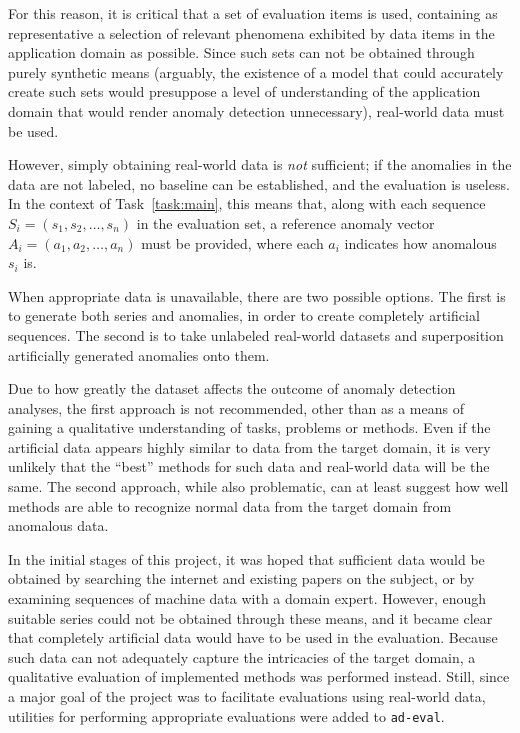 For this reason, it is critical that a set of evaluation items is used, containing as representative a selection of relevant phenomena exhibited by data items in the application domain as possible. Since such sets can not be obtained through purely synthetic means (arguably, the existence of a model that could accurately create such sets would presuppose a level of understanding of the application domain that would render anomaly detection unnecessary), real-world data must be used.

However, simply obtaining real-world data is \emph{not} sufficient; if the anomalies in the data are not labeled, no baseline can be established, and the evaluation is useless. In the context of Task~\ref{task:main}, this means that, along with each sequence $S_i = (s_1, s_2, \dots, s_n)$ in the evaluation set, a reference anomaly vector $A_i = (a_1, a_2, \dots, a_n)$ must be provided, where each $a_i$ indicates how anomalous $s_i$ is.

When appropriate data is unavailable, there are two possible options. The first is to generate both series and anomalies, in order to create completely artificial sequences. The second is to take unlabeled real-world datasets and superposition artificially generated anomalies onto them.

Due to how greatly the dataset affects the outcome of anomaly detection analyses, the first approach is not recommended, other than as a means of gaining a qualitative understanding of tasks, problems or methods. Even if the artificial data appears highly similar to data from the target domain, it is very unlikely that the ``best'' methods for such data and real-world data will be the same. The second approach, while also problematic, can at least suggest how well methods are able to recognize normal data from the target domain from anomalous data.

In the initial stages of this project, it was hoped that sufficient data would be obtained by searching the internet and existing papers on the subject, or by examining sequences of machine data with a domain expert. However, enough suitable series could not be obtained through these means, and it became clear that completely artificial data would have to be used in the evaluation. Because such data can not adequately capture the intricacies of the target domain, a qualitative evaluation of implemented methods was performed instead. Still, since a major goal of the project was to facilitate evaluations using real-world data, utilities for performing appropriate evaluations were added to \texttt{ad-eval}.
 
